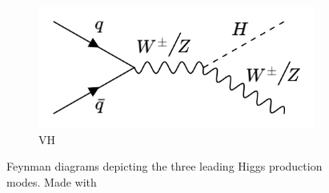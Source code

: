 \begin{figure}[htp]
     \hfill 
     \\
        \begin{subfigure}[b]{0.3\textwidth}
         \centering
         \includegraphics[width=\textwidth]{figures/theory_chapter/VH.png}
         \caption{VH}
         \label{fig:VH}
     \end{subfigure}
  \label{fig:Higgsmodes}
  \caption{Feynman diagrams depicting the three leading Higgs production modes. Made with \cite{FeynmanMaker}}  
\end{figure}

